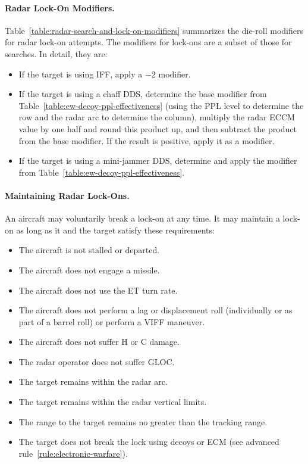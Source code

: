 {\paragraph{Radar Lock-On Modifiers.} Table~\ref{table:radar-search-and-lock-on-modifiers} summarizes the die-roll modifiers for radar lock-on attempts. The modifiers for lock-ons are a subset of those for searches. In detail, they are:

\begin{itemize}
    \item If the target is using IFF, apply a $-2$ modifier.

    \item If the target is using a chaff DDS, determine the base modifier from Table~\ref{table:ew-decoy-ppl-effectiveness} (using the PPL level to determine the row and the radar arc to determine the column), multiply the radar ECCM value by one half and round this product up, and then subtract the product from the base modifier. If the result is positive, apply it as a modifier.

    \item If the target is using a mini-jammer DDS, determine and apply the modifier from Table~\ref{table:ew-decoy-ppl-effectiveness}.

\end{itemize}

\paragraph{Maintaining Radar Lock-Ons.} An aircraft may voluntarily break a lock-on at any time.
It may maintain a lock-on as long as it and the target satisfy these requirements:

\begin{itemize}

    \item The aircraft is not stalled or departed.
    \item The aircraft does not engage a missile.
    \item The aircraft does not use the ET turn rate.
    \item The aircraft does not perform a lag or displacement roll (individually or as part of a barrel roll) or perform a VIFF maneuver.
    \item The aircraft does not suffer H or C damage.
    \item The radar operator does not suffer GLOC.
    \item The target remains within the radar arc.
    \item The target remains within the radar vertical limits.
    \item The range to the target remains no greater than the tracking range.
    \item The target does not break the lock using decoys or ECM (see advanced rule~\ref{rule:electronic-warfare}).


\end{itemize}}
